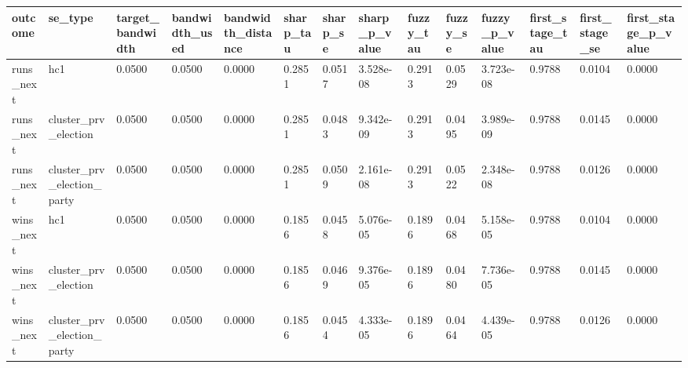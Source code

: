 \begin{tabular}{llllllllllllll}
\toprule
outcome & se\_type & target\_bandwidth & bandwidth\_used & bandwidth\_distance & sharp\_tau & sharp\_se & sharp\_p\_value & fuzzy\_tau & fuzzy\_se & fuzzy\_p\_value & first\_stage\_tau & first\_stage\_se & first\_stage\_p\_value \\
\midrule
runs\_next & hc1 & 0.0500 & 0.0500 & 0.0000 & 0.2851 & 0.0517 & 3.528e-08 & 0.2913 & 0.0529 & 3.723e-08 & 0.9788 & 0.0104 & 0.0000 \\
runs\_next & cluster\_prv\_election & 0.0500 & 0.0500 & 0.0000 & 0.2851 & 0.0483 & 9.342e-09 & 0.2913 & 0.0495 & 3.989e-09 & 0.9788 & 0.0145 & 0.0000 \\
runs\_next & cluster\_prv\_election\_party & 0.0500 & 0.0500 & 0.0000 & 0.2851 & 0.0509 & 2.161e-08 & 0.2913 & 0.0522 & 2.348e-08 & 0.9788 & 0.0126 & 0.0000 \\
wins\_next & hc1 & 0.0500 & 0.0500 & 0.0000 & 0.1856 & 0.0458 & 5.076e-05 & 0.1896 & 0.0468 & 5.158e-05 & 0.9788 & 0.0104 & 0.0000 \\
wins\_next & cluster\_prv\_election & 0.0500 & 0.0500 & 0.0000 & 0.1856 & 0.0469 & 9.376e-05 & 0.1896 & 0.0480 & 7.736e-05 & 0.9788 & 0.0145 & 0.0000 \\
wins\_next & cluster\_prv\_election\_party & 0.0500 & 0.0500 & 0.0000 & 0.1856 & 0.0454 & 4.333e-05 & 0.1896 & 0.0464 & 4.439e-05 & 0.9788 & 0.0126 & 0.0000 \\
\bottomrule
\end{tabular}

